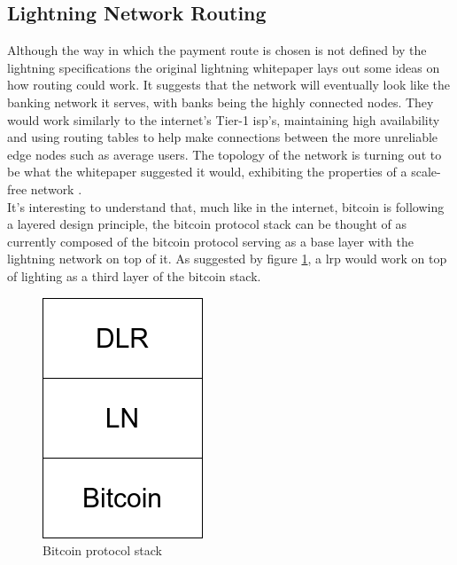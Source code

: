 \subsection{Lightning Network Routing}
\label{ssec:lightning_network_routing}

Although the way in which the payment route is chosen is not defined by the lightning specifications \cite{lightning_network_specs} the original lightning whitepaper \cite{lightning_network} lays out some ideas on how routing could work. It suggests that the network will eventually look like the banking network it serves, with banks being the highly connected nodes. They would work similarly to the internet's Tier-1 \acrshort{isp}'s, maintaining high availability and using routing tables to help make connections between the more unreliable edge nodes such as average users. The topology of the network is turning out to be what the whitepaper suggested it would, exhibiting the properties of a scale-free network \cite{ln_analysis} \cite{network_science}. \\
It's interesting to understand that, much like in the internet, bitcoin is following a layered design principle, the bitcoin protocol stack can be thought of as currently composed of the bitcoin protocol serving as a base layer with the lightning network on top of it. As suggested by figure \ref{fig:bitcoin_protocol_stack}, a \acrfull{lrp} would work on top of lighting as a third layer of the bitcoin stack.

\begin{figure}[H]
\begin{center}
  \includegraphics[width=0.2\linewidth]{images/protocol_stack.png}
  \caption{Bitcoin protocol stack}
  \label{fig:bitcoin_protocol_stack}
  \end{center}
\end{figure}

